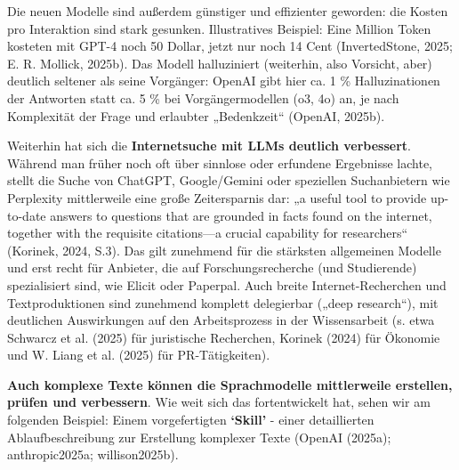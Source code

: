 \documentclass[
  ngerman,
  letterpaper,
  DIV=11]{scrreprt}
\begin{document}
Die neuen Modelle sind außerdem günstiger und effizienter geworden: die
Kosten pro Interaktion sind stark gesunken. Illustratives Beispiel: Eine
Million Token kosteten mit GPT-4 noch 50 Dollar, jetzt nur noch 14 Cent
(InvertedStone, 2025; E. R. Mollick, 2025b). Das Modell halluziniert
(weiterhin, also Vorsicht, aber) deutlich seltener als seine Vorgänger:
OpenAI gibt hier ca. 1 \% Halluzinationen der Antworten statt ca. 5 \%
bei Vorgängermodellen (o3, 4o) an, je nach Komplexität der Frage und
erlaubter „Bedenkzeit`` (OpenAI, 2025b).

Weiterhin hat sich die \textbf{Internetsuche mit LLMs deutlich
verbessert}. Während man früher noch oft über sinnlose oder erfundene
Ergebnisse lachte, stellt die Suche von ChatGPT, Google/Gemini oder
speziellen Suchanbietern wie Perplexity mittlerweile eine große
Zeitersparnis dar: „a useful tool to provide up-to-date answers to
questions that are grounded in facts found on the internet, together
with the requisite citations---a crucial capability for researchers``
(Korinek, 2024, S.3). Das gilt zunehmend für die stärksten allgemeinen
Modelle und erst recht für Anbieter, die auf Forschungsrecherche (und
Studierende) spezialisiert sind, wie Elicit oder Paperpal. Auch breite
Internet-Recherchen und Textproduktionen sind zunehmend komplett
delegierbar („deep research``), mit deutlichen Auswirkungen auf den
Arbeitsprozess in der Wissensarbeit (s. etwa Schwarcz et al. (2025) für
juristische Recherchen, Korinek (2024) für Ökonomie und W. Liang et al.
(2025) für PR-Tätigkeiten).

\textbf{Auch komplexe Texte können die Sprachmodelle mittlerweile
erstellen, prüfen und verbessern}. Wie weit sich das fortentwickelt hat,
sehen wir am folgenden Beispiel: Einem vorgefertigten \textbf{`Skill'} -
einer detaillierten Ablaufbeschreibung zur Erstellung komplexer Texte
(OpenAI (2025a); anthropic2025a; willison2025b).
\end{document}
